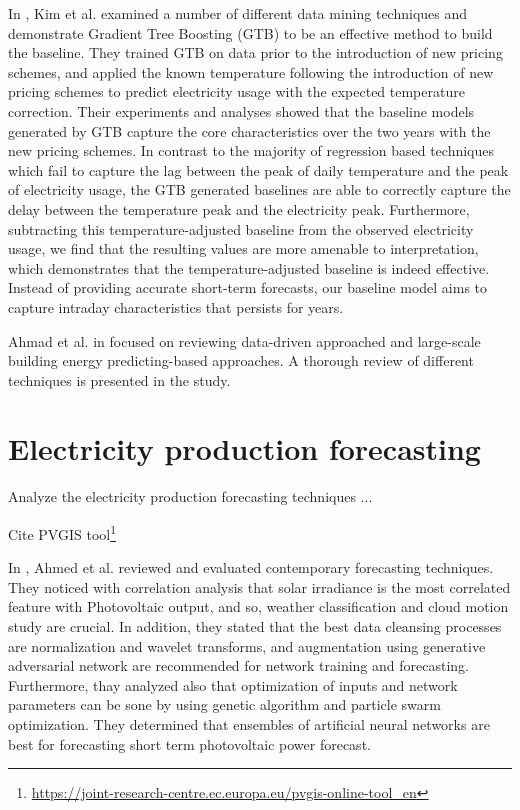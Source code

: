 In \cite{7463810}, Kim et al. examined a number of different data mining techniques and demonstrate Gradient Tree Boosting (GTB) to be an effective method to build the baseline.
They trained GTB on data prior to the introduction of new pricing schemes, and applied the known temperature following the introduction of new pricing schemes to predict electricity usage with the expected temperature correction.
Their experiments and analyses showed that the baseline models generated by GTB capture the core characteristics over the two years with the new pricing schemes.
In contrast to the majority of regression based techniques which fail to capture the lag between the peak of daily temperature and the peak of electricity usage, the GTB generated baselines are able to correctly capture the delay between the temperature peak and the electricity peak.
Furthermore, subtracting this temperature-adjusted baseline from the observed electricity usage, we find that the resulting values are more amenable to interpretation, which demonstrates that the temperature-adjusted baseline is indeed effective.
Instead of providing accurate short-term forecasts, our baseline model aims to capture intraday characteristics that persists for years.

Ahmad et al. in \cite{AHMAD2018301} focused on reviewing data-driven approached and large-scale building energy predicting-based approaches.
A thorough review of different techniques is presented in the study.


\section{Electricity production forecasting}
\label{sec:productionsoa}
\vspace{0.2 cm}

Analyze the electricity production forecasting techniques ...

Cite PVGIS tool\footnote{ \url{https://joint-research-centre.ec.europa.eu/pvgis-online-tool_en} }

In \cite{AHMED2020109792}, Ahmed et al. reviewed and evaluated contemporary forecasting techniques.
They noticed with correlation analysis that solar irradiance is the most correlated feature with Photovoltaic output, and so, weather classification and cloud motion study are crucial.
In addition, they stated that the best data cleansing processes are normalization and wavelet transforms, and augmentation using generative adversarial network are recommended for network training and forecasting.
Furthermore, thay analyzed also that optimization of inputs and network parameters can be sone by using genetic algorithm and particle swarm optimization.
They determined that ensembles of artificial neural networks are best for forecasting short term photovoltaic power forecast.

